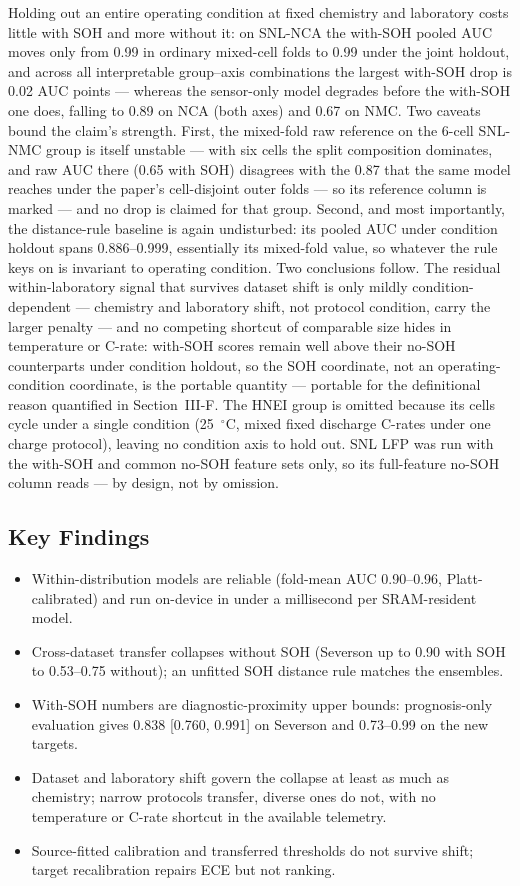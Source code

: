 Holding out an entire operating condition at fixed chemistry and laboratory costs little with SOH and more without it: on SNL-NCA the with-SOH pooled AUC moves only from 0.99 in ordinary mixed-cell folds to 0.99 under the joint holdout, and across all interpretable group--axis combinations the largest with-SOH drop is 0.02 AUC points --- whereas the sensor-only model degrades before the with-SOH one does, falling to 0.89 on NCA (both axes) and 0.67 on NMC. Two caveats bound the claim's strength. First, the mixed-fold raw reference on the 6-cell SNL-NMC group is itself unstable --- with six cells the split composition dominates, and raw AUC there (0.65 with SOH) disagrees with the 0.87 that the same model reaches under the paper's cell-disjoint outer folds --- so its reference column is marked --- and no drop is claimed for that group. Second, and most importantly, the distance-rule baseline is again undisturbed: its pooled AUC under condition holdout spans 0.886--0.999, essentially its mixed-fold value, so whatever the rule keys on is invariant to operating condition. Two conclusions follow. The residual within-laboratory signal that survives dataset shift is only mildly condition-dependent --- chemistry and laboratory shift, not protocol condition, carry the larger penalty --- and no competing shortcut of comparable size hides in temperature or C-rate: with-SOH scores remain well above their no-SOH counterparts under condition holdout, so the SOH coordinate, not an operating-condition coordinate, is the portable quantity --- portable for the definitional reason quantified in Section~III-F. The HNEI group is omitted because its cells cycle under a single condition (25~$^\circ$C, mixed fixed discharge C-rates under one charge protocol), leaving no condition axis to hold out. SNL LFP was run with the with-SOH and common no-SOH feature sets only, so its full-feature no-SOH column reads --- by design, not by omission.

\subsection{Key Findings}
\begin{itemize}
\item Within-distribution models are reliable (fold-mean AUC 0.90--0.96, Platt-calibrated) and run on-device in under a millisecond per SRAM-resident model.
\item Cross-dataset transfer collapses without SOH (Severson up to 0.90 with SOH to 0.53--0.75 without); an unfitted SOH distance rule matches the ensembles.
\item With-SOH numbers are diagnostic-proximity upper bounds: prognosis-only evaluation gives 0.838 [0.760, 0.991] on Severson and 0.73--0.99 on the new targets.
\item Dataset and laboratory shift govern the collapse at least as much as chemistry; narrow protocols transfer, diverse ones do not, with no temperature or C-rate shortcut in the available telemetry.
\item Source-fitted calibration and transferred thresholds do not survive shift; target recalibration repairs ECE but not ranking.
\end{itemize}

